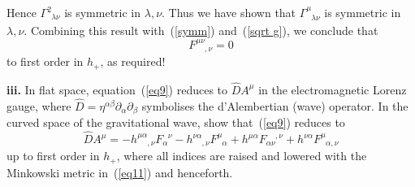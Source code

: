 \documentclass[a4paper]{article} %
\newcommand{\ph}[1]{\phantom{#1}}
\begin{document}
Hence  $\Gamma^{2}_{\ph{2}\lambda\nu}$ is symmetric in $\lambda,\nu$. Thus we have shown that $\Gamma^{\mu}_{\ph{\mu}\lambda\nu}$ is symmetric in $\lambda,\nu$. Combining this result with~(\ref{symm}) and~(\ref{sqrt g}), we conclude that
\begin{equation}
F^{\mu\nu}_{\ph{\mu\nu},\nu}=0 \label{eq9}
\end{equation}
to first order in $h_+$, as required!


\begin{framed}
\textbf{iii.} In flat space, equation~(\ref{eq9}) reduces to $\hat{D}A^\mu$ in the electromagnetic Lorenz gauge, where $\hat{D}=\eta^{\alpha\beta}\partial_{\alpha}\partial_{\beta}$ symbolises the d'Alembertian (wave) operator. In the curved space of the gravitational wave, show that~(\ref{eq9}) reduces to
\begin{equation}
\hat{D}A^{\mu}=-h^{\mu\alpha}_{\ph{\mu\alpha},\nu}F_{\alpha}^{\ph{\alpha}\nu}-h^{\nu\alpha}_{\ph{\nu\alpha},\nu}
F^{\mu}_{\ph{\mu}\alpha}+h^{\mu\alpha} F_{\alpha\nu}^{\ph{\alpha\nu},\nu}+h^{\nu\alpha} F^{\mu}_{\ph{\mu}\alpha,\nu}\label{eq11}
\end{equation}
up to first order in $h_+$, where all indices are raised and lowered with the Minkowski metric in~(\ref{eq11}) and henceforth.
\end{framed}
\end{document}
